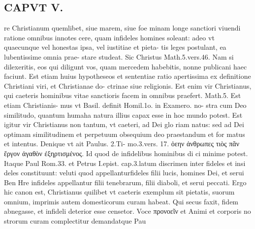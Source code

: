 \documentclass{article}
\begin{document}
\begin{pages}
\section*{CAPVT  V. }
\marginpar{[ p.265 ]}\pstart re Christianum quemlibet, siue marem, siue foe minam longe sanctiori viuendi ratione omnibus innotes cere, quam infideles homines soleant: adeo vt quaecunque vel honestas ipsa, vel iustitiae et pieta- tis leges postulant, ea lubentissime omnia prae- stare studeat. Sic Christus Math.5.vers.46. Nam si dilexeritis, eos qui diligunt vos, quam mercedem habebitis, nonne publicani haec faciunt. Est etiam huius hypotheseos et sententiae ratio apertissima ex definitione Christiani viri, et Christianae do- ctrinae siue religionis. Est enim vir Christianus, qui caeteris hominibus vitae sanctioris facem in omnibus praefert. Math.5. Est etiam Christianis- mus vt Basil. definit Homil.1o. in Examero. no- stra cum Deo similitudo, quantum humaha natura illius capax esse in hoc mundo potest. Est igitur vir Christianus non tantum, vt caeteri, ad Dei glo riam natus: sed ad Dei optimam similitudinem et perpetuum obsequium deo praestandum et for matus et intentus. Denique vt ait Paulus. 2.Ti- mo.3.vers. 17. ὁεην ἀνθρωπες τιὸς πᾶν ἔργον ἀγαθὸν ἐξηρτισμένος. Id quod de infidelibus hominibus di ci minime potest. Itaque Paul Rom.33. et Petrus I.epist. cap.3.latum discrimen inter fideles et insi deles constituunt: veluti quod appellanturfideles filii lucis, homines Dei, et serui Ben Hre infideles appellantur filii tenebrarum, filii diaboli, et serui peccati. Ergo hic canon est, Christianus quilibet vt caeteris exemplum sit pietatis, suorum omnium, imprimis autem domesticorum curam habeat. Qui secus faxit, fidem abnegasse, et infideli deterior esse censetor. Voce προνοεῖν et Animi et corporis no strorum curam complectitur demandatque Pau  \pend

\end{pages}
\end{document}
